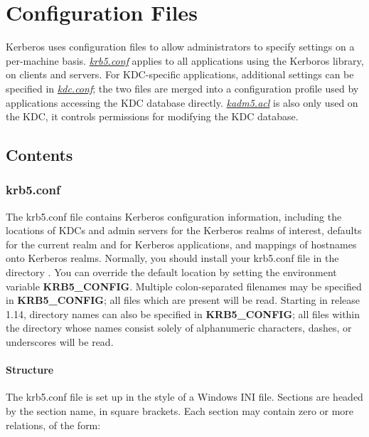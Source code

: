 \documentclass[letterpaper,10pt,english]{sphinxmanual}
\begin{document}
\chapter{Configuration Files}
\label{admin/conf_files/index:configuration-files}\label{admin/conf_files/index::doc}
Kerberos uses configuration files to allow administrators to specify
settings on a per-machine basis.  {\hyperref[admin/conf_files/krb5_conf:krb5-conf-5]{\emph{krb5.conf}}} applies to all
applications using the Kerboros library, on clients and servers.
For KDC-specific applications, additional settings can be specified in
{\hyperref[admin/conf_files/kdc_conf:kdc-conf-5]{\emph{kdc.conf}}}; the two files are merged into a configuration profile
used by applications accessing the KDC database directly.  {\hyperref[admin/conf_files/kadm5_acl:kadm5-acl-5]{\emph{kadm5.acl}}}
is also only used on the KDC, it controls permissions for modifying the
KDC database.


\section{Contents}
\label{admin/conf_files/index:contents}

\subsection{krb5.conf}
\label{admin/conf_files/krb5_conf::doc}\label{admin/conf_files/krb5_conf:krb5-conf}\label{admin/conf_files/krb5_conf:krb5-conf-5}
The krb5.conf file contains Kerberos configuration information,
including the locations of KDCs and admin servers for the Kerberos
realms of interest, defaults for the current realm and for Kerberos
applications, and mappings of hostnames onto Kerberos realms.
Normally, you should install your krb5.conf file in the directory
.  You can override the default location by setting the
environment variable \textbf{KRB5\_CONFIG}.  Multiple colon-separated
filenames may be specified in \textbf{KRB5\_CONFIG}; all files which are
present will be read.  Starting in release 1.14, directory names can
also be specified in \textbf{KRB5\_CONFIG}; all files within the directory
whose names consist solely of alphanumeric characters, dashes, or
underscores will be read.


\subsubsection{Structure}
\label{admin/conf_files/krb5_conf:structure}
The krb5.conf file is set up in the style of a Windows INI file.
Sections are headed by the section name, in square brackets.  Each
section may contain zero or more relations, of the form:
\end{document}
